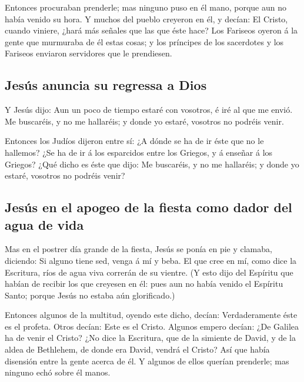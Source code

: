  Entonces procuraban prenderle; mas ninguno puso en él
mano, porque aun no había venido su hora.  Y muchos del
pueblo creyeron en él, y decían: El Cristo, cuando viniere, ¿hará más
señales que las que éste hace?  Los Fariseos oyeron á la
gente que murmuraba de él estas cosas; y los príncipes de los sacerdotes
y los Fariseos enviaron servidores que le prendiesen.

\hypertarget{jesuxfas-anuncia-su-regressa-a-dios}{%
\subsection{Jesús anuncia su regressa a
Dios}\label{jesuxfas-anuncia-su-regressa-a-dios}}

 Y Jesús dijo: Aun un poco de tiempo estaré con vosotros, é
iré al que me envió.  Me buscaréis, y no me hallaréis; y
donde yo estaré, vosotros no podréis venir.

 Entonces los Judíos dijeron entre sí: ¿A dónde se ha de ir
éste que no le hallemos? ¿Se ha de ir á los esparcidos entre los
Griegos, y á enseñar á los Griegos?  ¿Qué dicho es éste que
dijo: Me buscaréis, y no me hallaréis; y donde yo estaré, vosotros no
podréis venir?

\hypertarget{jesuxfas-en-el-apogeo-de-la-fiesta-como-dador-del-agua-de-vida}{%
\subsection{Jesús en el apogeo de la fiesta como dador del agua de
vida}\label{jesuxfas-en-el-apogeo-de-la-fiesta-como-dador-del-agua-de-vida}}

 Mas en el postrer día grande de la fiesta, Jesús se ponía
en pie y clamaba, diciendo: Si alguno tiene sed, venga á mí y beba.
 El que cree en mí, como dice la Escritura, ríos de agua
viva correrán de su vientre.  (Y esto dijo del Espíritu que
habían de recibir los que creyesen en él: pues aun no había venido el
Espíritu Santo; porque Jesús no estaba aún glorificado.)

 Entonces algunos de la multitud, oyendo este dicho,
decían: Verdaderamente éste es el profeta.  Otros decían:
Este es el Cristo. Algunos empero decían: ¿De Galilea ha de venir el
Cristo?  ¿No dice la Escritura, que de la simiente de
David, y de la aldea de Bethlehem, de donde era David, vendrá el Cristo?
 Así que había disensión entre la gente acerca de él.
 Y algunos de ellos querían prenderle; mas ninguno echó
sobre él manos.

